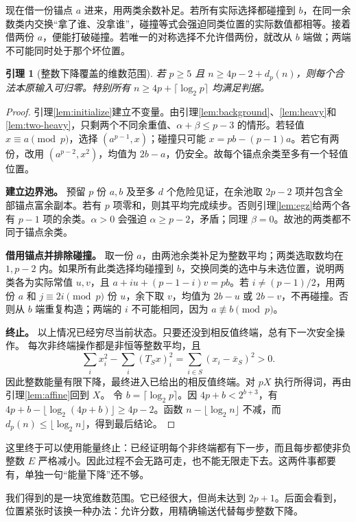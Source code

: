 \documentclass[11pt,a4paper,oneside,openany]{book}
\newtheorem{lemma}[theorem]{引理}
\theoremstyle{definition}
\numberwithin{equation}{chapter}
\begin{document}
现在借一份锚点 $a$ 进来，用两类余数补足。若所有实际选择都碰撞到 $b$，在同一余数类内交换“拿了谁、没拿谁”，碰撞等式会强迫同类位置的实际数值都相等。接着借两份 $a$，便能打破碰撞。若唯一的对称选择不允许借两份，就改从 $b$ 端做；两端不可能同时处于那个坏位置。
\begin{lemma}[整数下降覆盖的维数范围]\label{lem:integer-range}
若 $p\ge5$ 且 $n\ge4p-2+d_p(n)$，则每个合法本原输入可归零。特别所有 $n\ge4p+\lceil\log_2p\rceil$ 均满足判据。
\end{lemma}
\begin{proof}
引理\ref{lem:initialize}建立不变量。由引理\ref{lem:background}、\ref{lem:heavy}和\ref{lem:two-heavy}，只剩两个不同余重值、$\alpha+\beta\le p-3$ 的情形。若轻值 $x\equiv a\pmod p$，选择 $(a^{p-1},x)$；碰撞只可能 $x=pb-(p-1)a$。若它有两份，改用 $(a^{p-2},x^2)$，均值为 $2b-a$，仍安全。故每个锚点余类至多有一个轻值位置。
\par\noindent\textbf{建立边界池。}
预留 $p$ 份 $a,b$ 及至多 $d$ 个危险见证，在余池取 $2p-2$ 项并包含全部锚点富余副本。若有 $p$ 项零和，则其平均完成续步。否则引理\ref{lem:egz}给两个各有 $p-1$ 项的余类。$\alpha>0$ 会强迫 $\alpha\ge p-2$，矛盾；同理 $\beta=0$。故池的两类都不同于锚点余类。
\par\noindent\textbf{借用锚点并排除碰撞。}
取一份 $a$，由两池余类补足为整数平均；两类选取数均在 $1,p-2$ 内。如果所有此类选择均碰撞到 $b$，交换同类的选中与未选位置，说明两类各为实际常值 $u,v$，且 $a+iu+(p-1-i)v=pb$。若 $i\ne(p-1)/2$，用两份 $a$ 和 $j\equiv2i\pmod p$ 份 $u$，余下取 $v$，均值为 $2b-u$ 或 $2b-v$，不再碰撞。否则从 $b$ 端重复构造；两端的 $i$ 不可能相同，因为 $a\not\equiv b\pmod p$。
\par\noindent\textbf{终止。}
以上情况已经穷尽当前状态。只要还没到相反值终端，总有下一次安全操作。
每次非终端操作都是非恒等整数平均，且
\[\sum_i x_i^2-\sum_i(T_Sx)_i^2=\sum_{i\in S}(x_i-\bar x_S)^2>0.
\]
因此整数能量有限下降，最终进入已给出的相反值终端。对 $pX$ 执行所得词，再由引理\ref{lem:affine}回到 $X$。
令 $b=\lceil\log_2p\rceil$。因 $4p+b<2^{b+3}$，有 $4p+b-\lfloor\log_2(4p+b)\rfloor\ge4p-2$。函数 $n-\lfloor\log_2n\rfloor$ 不减，而 $d_p(n)\le\lfloor\log_2n\rfloor$，得到最后结论。
\end{proof}

这里终于可以使用能量终止：已经证明每个非终端都有下一步，而且每步都使非负整数 $E$ 严格减小。因此过程不会无路可走，也不能无限走下去。这两件事都要有，单独一句“能量下降”还不够。

我们得到的是一块宽维数范围。它已经很大，但尚未达到 $2p+1$。后面会看到，位置紧张时该换一种办法：允许分数，用精确输送代替每步整数下降。
\end{document}
